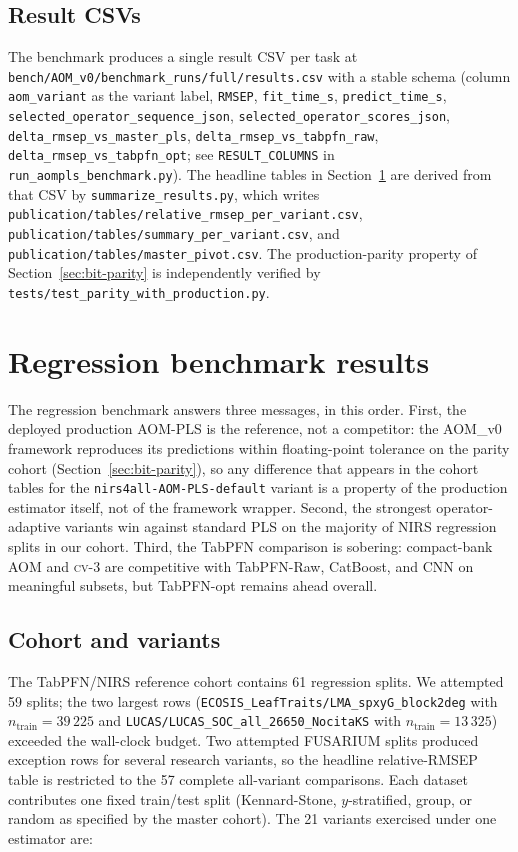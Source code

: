 \documentclass[review,a4paper]{elsarticle}
\newcommand{\AOM}{\textsc{AOM}\xspace}
\newcommand{\PLS}{\textsc{PLS}\xspace}
\begin{document}
\subsection{Result CSVs}
The benchmark produces a single result CSV per task at
\verb|bench/AOM_v0/benchmark_runs/full/results.csv| with a stable
schema (column \verb|aom_variant| as the variant label,
\verb|RMSEP|, \verb|fit_time_s|, \verb|predict_time_s|,
\verb|selected_operator_sequence_json|,
\verb|selected_operator_scores_json|,
\verb|delta_rmsep_vs_master_pls|,
\verb|delta_rmsep_vs_tabpfn_raw|,
\verb|delta_rmsep_vs_tabpfn_opt|; see \verb|RESULT_COLUMNS| in
\verb|run_aompls_benchmark.py|). The headline tables in
Section~\ref{sec:results-regression} are derived from that CSV by
\verb|summarize_results.py|, which writes
\verb|publication/tables/relative_rmsep_per_variant.csv|,
\verb|publication/tables/summary_per_variant.csv|, and
\verb|publication/tables/master_pivot.csv|. The production-parity
property of
Section~\ref{sec:bit-parity} is independently verified by
\verb|tests/test_parity_with_production.py|.

\section{Regression benchmark results}\label{sec:results-regression}

The regression benchmark answers three messages, in this order. First,
the deployed production \AOM-\PLS is the reference, not a competitor:
the \AOM\_v0 framework reproduces its predictions within
floating-point tolerance on the parity cohort
(Section~\ref{sec:bit-parity}), so any difference that
appears in the cohort tables for the
\verb|nirs4all-AOM-PLS-default| variant is a property of the production
estimator itself, not of the framework wrapper. Second,
the strongest operator-adaptive variants win against standard \PLS on
the majority of NIRS regression splits in our cohort. Third, the
TabPFN comparison is sobering: compact-bank \AOM and \textsc{cv}-3 are
competitive with TabPFN-Raw, CatBoost, and CNN on meaningful subsets,
but TabPFN-opt remains ahead overall.

\subsection{Cohort and variants}

The TabPFN/NIRS reference cohort contains 61 regression splits. We
attempted 59 splits; the two largest rows
(\texttt{ECOSIS\_LeafTraits/LMA\_spxyG\_block2deg} with
$n_\text{train}=39\,225$ and
\texttt{LUCAS/LUCAS\_SOC\_all\_26650\_NocitaKS} with
$n_\text{train}=13\,325$) exceeded the wall-clock budget. Two attempted
FUSARIUM splits produced exception rows for several research variants,
so the headline relative-RMSEP table is restricted to the 57 complete
all-variant comparisons. Each dataset contributes one fixed train/test
split (Kennard-Stone, $y$-stratified, group, or random as specified by
the master cohort). The 21 variants exercised under one estimator are:
\end{document}
